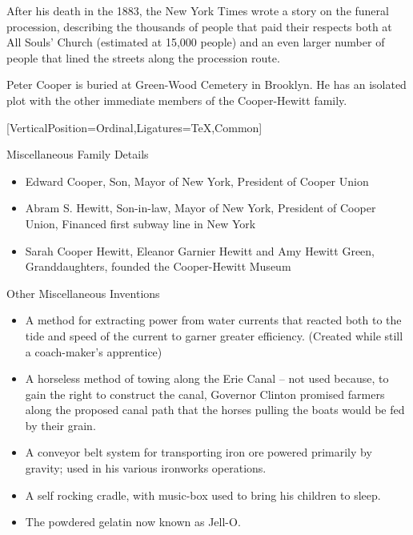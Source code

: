 \documentclass{article}
\begin{document}
\begin{minipage}[t]{0.46\linewidth}
\begin{enumList}
\item After his death in the 1883, the New York Times wrote a story on the
funeral procession, describing the { thousands of people
that paid their respects} both at All Souls' Church (estimated at 15,000 people)
and an even larger number of people that lined the streets along the procession
route.

\item Peter Cooper is buried at { Green-Wood Cemetery} in
Brooklyn. He has an isolated plot with the other immediate members of the
Cooper-Hewitt family.

\setcounter{enumTemp}{\value{enumListi}}
\end{enumList}
\end{minipage}\hfill
\begin{minipage}[t]{0.46\linewidth}
[VerticalPosition=Ordinal,Ligatures={TeX,Common}]
\fontsize{11pt}{13pt}\selectfont
\raggedright
\upshape
\begin{enumList}
\setcounter{enumListi}{\value{enumTemp}}

\item Miscellaneous Family Details
\begin{itemize}[leftmargin=*]
\item Edward Cooper, Son, Mayor of New York, President of Cooper Union
\item Abram S. Hewitt, Son-in-law, Mayor of New York, President of Cooper Union,
Financed first subway line in New York
\item Sarah Cooper Hewitt, Eleanor Garnier Hewitt and Amy Hewitt Green,
Granddaughters, founded the Cooper-Hewitt Museum
\end{itemize}

\item Other Miscellaneous Inventions
\begin{itemize}[leftmargin=*]
\item A method for extracting power from water currents that reacted both to the
tide and speed of the current to garner greater efficiency. (Created while
still a coach-maker's apprentice)
\item A horseless method of towing along the Erie Canal -- not used because, to gain the right to construct the canal, Governor Clinton promised
farmers along the proposed canal path that the horses pulling the boats would be fed by their grain.
\item A conveyor belt system for transporting iron ore powered
primarily by gravity; used in his various ironworks operations.
\item A self rocking cradle, with music-box used to bring his children to sleep.
\item The powdered gelatin now known as Jell-O.
\end{itemize}
\end{enumList}


\end{minipage}
\end{document}
